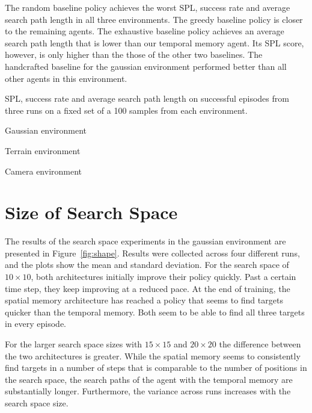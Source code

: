 The random baseline policy achieves the worst SPL, success rate and average search path length in all three environments.
The greedy baseline policy is closer to the remaining agents.
The exhaustive baseline policy achieves an average search path length that is lower than our temporal memory agent.
Its SPL score, however, is only higher than the those of the other two baselines.
The handcrafted baseline for the gaussian environment performed better than all other agents in this environment. %

\begin{table}
    \centering
    \label{tab:metrics}
    \caption[Performance metrics for each environment.]{SPL, success rate and average search path length on successful episodes from three runs on a fixed set of a 100 samples from each environment.}
    Gaussian environment\par\vspace{0.5em}
    
    \par\vspace{1em}Terrain environment\par\vspace{0.5em}
    
    \par\vspace{1em}Camera environment\par\vspace{0.5em}
    
\end{table}

\section{Size of Search Space}
\label{sec:shape}

The results of the search space experiments in the gaussian environment are presented in Figure~\ref{fig:shape}.
Results were collected across four different runs, and the plots show the mean and standard deviation.
For the search space of \(10 \times 10\), both architectures initially improve their policy quickly.
Past a certain time step, they keep improving at a reduced pace.
At the end of training, the spatial memory architecture has reached a policy that seems to find targets quicker than the temporal memory.
Both seem to be able to find all three targets in every episode.

For the larger search space sizes with \(15 \times 15\) and \(20 \times 20\) the difference between the two architectures is greater.
While the spatial memory seems to consistently find targets in a number of steps that is comparable to the number of positions in the search space,
the search paths of the agent with the temporal memory are substantially longer.
Furthermore, the variance across runs increases with the search space size.

